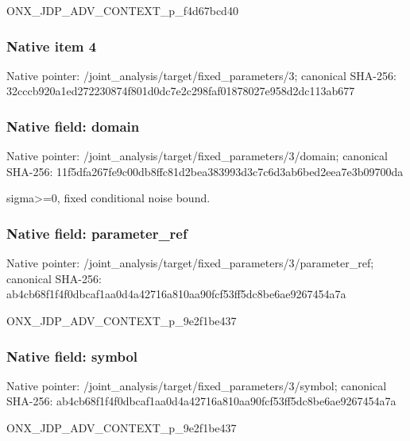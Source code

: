 \documentclass[10pt,a4paper]{article}
\begin{document}
\begingroup\raggedright\sloppy ONX\_\allowbreak{}JDP\_\allowbreak{}ADV\_\allowbreak{}CONTEXT\_\allowbreak{}p\_\allowbreak{}f4d67bcd40\par\endgroup

\subsubsection{Native item 4}
Native pointer: /joint\_\allowbreak{}analysis/target/fixed\_\allowbreak{}parameters/3; canonical SHA-256: 32cccb920a1ed272230874f801d0dc7e2c298faf01878027e958d2dc113ab677

\subsubsection{Native field: domain}
Native pointer: /joint\_\allowbreak{}analysis/target/fixed\_\allowbreak{}parameters/3/domain; canonical SHA-256: 11f5dfa267fe9c00db8ffc81d2bea383993d3c7c6d3ab6bed2eea7e3b09700da

\begingroup\raggedright\sloppy sigma>=\allowbreak{}0,\allowbreak{} fixed conditional noise bound.\par\endgroup

\subsubsection{Native field: parameter\_\allowbreak{}ref}
Native pointer: /joint\_\allowbreak{}analysis/target/fixed\_\allowbreak{}parameters/3/parameter\_\allowbreak{}ref; canonical SHA-256: ab4cb68f1f4f0dbcaf1aa0d4a42716a810aa90fcf53ff5dc8be6ae9267454a7a

\begingroup\raggedright\sloppy ONX\_\allowbreak{}JDP\_\allowbreak{}ADV\_\allowbreak{}CONTEXT\_\allowbreak{}p\_\allowbreak{}9e2f1be437\par\endgroup

\subsubsection{Native field: symbol}
Native pointer: /joint\_\allowbreak{}analysis/target/fixed\_\allowbreak{}parameters/3/symbol; canonical SHA-256: ab4cb68f1f4f0dbcaf1aa0d4a42716a810aa90fcf53ff5dc8be6ae9267454a7a

\begingroup\raggedright\sloppy ONX\_\allowbreak{}JDP\_\allowbreak{}ADV\_\allowbreak{}CONTEXT\_\allowbreak{}p\_\allowbreak{}9e2f1be437\par\endgroup
\end{document}
